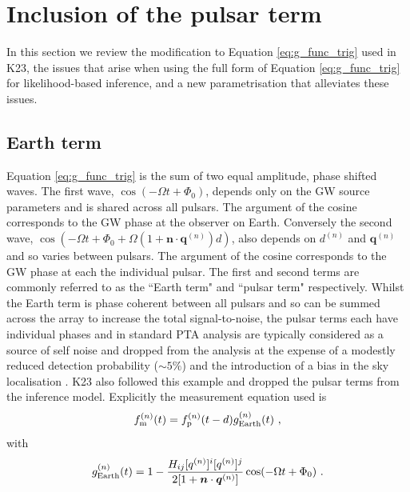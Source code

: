 \documentclass[fleqn,usenatbib,useAMS]{mnras}
\begin{document}
\section{Inclusion of the pulsar term}\label{sec:pulsar_term}
In this section we review the modification to Equation \eqref{eq:g_func_trig} used in K23, the issues that arise when using the full form of Equation \eqref{eq:g_func_trig}  for likelihood-based inference, and a new parametrisation that alleviates these issues. \newline 



\subsection{Earth term}
Equation \eqref{eq:g_func_trig} is the sum of two equal amplitude, phase shifted waves. The first wave, $\cos(-\Omega t + \Phi_0)$, depends only on the GW source parameters and is shared across all pulsars. The argument of the cosine corresponds to the GW phase at the observer on Earth.  Conversely the second wave, $\cos \left(-\Omega t +\Phi_0 + \Omega \left(1 + \boldsymbol{n}\cdot \boldsymbol{q}^{(n)} \right)  d \right)$, also depends on $d^{(n)}$ and $\boldsymbol{q}^{(n)}$ and so varies between pulsars. The argument of the cosine corresponds to the GW phase at each the individual pulsar. The first and second terms are commonly referred to as the ``Earth term" and ``pulsar term" respectively. Whilst the Earth term is phase coherent between all pulsars and so can be summed across the array to increase the total signal-to-noise, the pulsar terms each have individual phases and in standard PTA analysis are typically considered as a source of self noise and dropped from the analysis \citep[e.g.][]{Sesana2010,Babak2012,Petiteau2013,Zhu2015,Taylors2016,Goldstein2018,Charisi2023arXiv230403786C} at the expense of a modestly reduced detection probability ($\sim 5 \%$) and the introduction of a bias in the sky localisation \citep{Zhupulsarterms,Chen2022}. K23 also followed this example and dropped the pulsar terms from the inference model. Explicitly the measurement equation used is
\begin{equation}
	f_{\rm m}^{(n)}(t) = f_{\rm p}^{(n)}(t-d) g^{(n)}_{\rm Earth}(t) \ , 
	\label{eq:measuremen_earth}
\end{equation}
with
\begin{equation}
	g^{(n)}_{\rm Earth}(t) = 1 - \frac{ H_{ij}[q^{(n)}]^i [q^{(n)}]^j}{2[1 + \boldsymbol{n}\cdot \boldsymbol{q}^{(n)}] }  \cos(-\Omega t +\Phi_0)  \ .
	\label{eq:g_func_trig_earth}
\end{equation}
\end{document}
